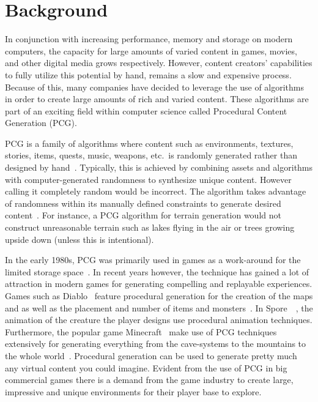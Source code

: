 \section{Background}

In conjunction with increasing performance, memory and storage on modern computers, the capacity for large amounts of varied content in games, movies, and other digital media grows respectively.
However, content creators' capabilities to fully utilize this potential by hand, remains a slow and expensive process.
Because of this, many companies have decided to leverage the use of algorithms in order to create large amounts of rich and varied content.
These algorithms are part of an exciting field within computer science called Procedural Content Generation (PCG).

PCG is a family of algorithms where content such as environments, textures, stories, items, quests, music, weapons, etc.\ is randomly generated rather than designed by hand~\cite[p.1]{PCG_in_games}.
Typically, this is achieved by combining assets and algorithms with computer-generated randomness to synthesize unique content.
However calling it completely random would be incorrect.
The algorithm takes advantage of randomness within its manually defined constraints to generate desired content~\cite{Gamasutra}.
For instance, a PCG algorithm for terrain generation would not construct unreasonable terrain such as lakes flying in the air or trees growing upside down (unless this is intentional).
	
In the early 1980s, PCG was primarily used in games as a work-around for the limited storage space~\cite[p.4]{PCG_in_games}.
In recent years however, the technique has gained a lot of attraction in modern games for generating compelling and replayable experiences.
Games such as Diablo~\cite{diablo} feature procedural generation for the creation of the maps and as well as the placement and number of items and monsters~\cite[p.4]{PCG_in_games}.
In Spore~\cite{spore}~, the animation of the creature the player designs use procedural animation techniques\cite[p.4]{PCG_in_games}.
Furthermore, the popular game Minecraft~\cite{minecraft} make use of PCG techniques extensively for generating everything from the cave-systems to the mountains to the whole world~\cite[p.4]{PCG_in_games}.
Procedural generation can be used to generate pretty much any virtual content you could imagine.
Evident from the use of PCG in big commercial games there is a demand from the game industry to create large, impressive and unique environments for their player base to explore.

